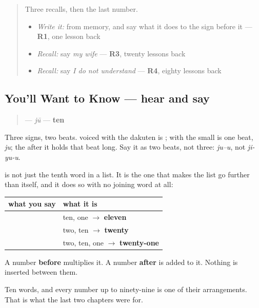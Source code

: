 \label{lesson:JA-C15-juu}



\begin{quote}
Three recalls, then the last number.

\begin{itemize}
\raggedright
  \item \emph{Write it:} \textbf{} from memory, and say what it does to the sign before it — \textbf{R1}, one lesson back
  \item \emph{Recall:} say \emph{my wife} — \textbf{R3}, twenty lessons back
  \item \emph{Recall:} say \emph{I do not understand} — \textbf{R4}, eighty lessons back
\end{itemize}
\end{quote}

\subsection*{You'll Want to Know — hear and say}
\begin{quote}
\textbf{} — \emph{jū} — \textbf{ten}
\end{quote}

Three signs, two beats. \textbf{} voiced with the dakuten is \textbf{}; \textbf{} with the small \textbf{} is one beat, \emph{ju}; the \textbf{} after it holds that beat long. Say it as two beats, not three: \emph{ju–u}, not \emph{ji-yu-u}.

\begin{grammarlens}[title={Grammar Lens — ten words, ninety-nine numbers}]
\textbf{} is not just the tenth word in a list. It is the one that makes the list go further than itself, and it does so with no joining word at all:

\noindent
\begin{tabularx}{\linewidth}{@{}>{\raggedright\arraybackslash}X>{\raggedright\arraybackslash}X@{}}
\toprule
\textbf{what you say} & \textbf{what it is} \\
\midrule
\textbf{\ja{じゅういち}} & ten, one $\to$ \textbf{eleven} \\
\textbf{\ja{にじゅう}} & two, ten $\to$ \textbf{twenty} \\
\textbf{\ja{にじゅういち}} & two, ten, one $\to$ \textbf{twenty-one} \\
\bottomrule
\end{tabularx}

A number \textbf{before}  multiplies it. A number \textbf{after}  is added to it. Nothing is inserted between them.

Ten words, and every number up to ninety-nine is one of their arrangements. That is what the last two chapters were for.
\end{grammarlens}

